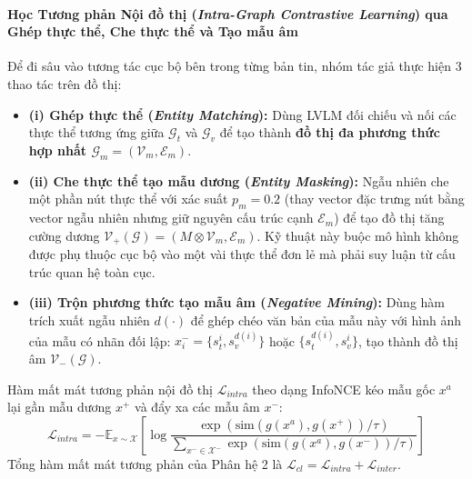 \documentclass[conference,10pt]{IEEEtran}
\begin{document}
\paragraph{Học Tương phản Nội đồ thị (\textit{Intra-Graph Contrastive Learning}) qua Ghép thực thể, Che thực thể và Tạo mẫu âm}
Để đi sâu vào tương tác cục bộ bên trong từng bản tin, nhóm tác giả thực hiện 3 thao tác trên đồ thị:
\begin{itemize}
    \item \textbf{(i) Ghép thực thể (\textit{Entity Matching}):} Dùng LVLM đối chiếu và nối các thực thể tương ứng giữa $\mathcal{G}_t$ và $\mathcal{G}_v$ để tạo thành \textbf{đồ thị đa phương thức hợp nhất $\mathcal{G}_m = (\mathcal{V}_m, \mathcal{E}_m)$}.
    \item \textbf{(ii) Che thực thể tạo mẫu dương (\textit{Entity Masking}):} Ngẫu nhiên che một phần nút thực thể với xác suất $p_m = 0.2$ (thay vector đặc trưng nút bằng vector ngẫu nhiên nhưng giữ nguyên cấu trúc cạnh $\mathcal{E}_m$) để tạo đồ thị tăng cường dương $\mathcal{V}_+(\mathcal{G}) = (M \otimes \mathcal{V}_m, \mathcal{E}_m)$. Kỹ thuật này buộc mô hình không được phụ thuộc cục bộ vào một vài thực thể đơn lẻ mà phải suy luận từ cấu trúc quan hệ toàn cục.
    \item \textbf{(iii) Trộn phương thức tạo mẫu âm (\textit{Negative Mining}):} Dùng hàm trích xuất ngẫu nhiên $d(\cdot)$ để ghép chéo văn bản của mẫu này với hình ảnh của mẫu có nhãn đối lập: $x_i^- = \{s_t^i, s_v^{d(i)}\}$ hoặc $\{s_t^{d(i)}, s_v^i\}$, tạo thành đồ thị âm $\mathcal{V}_-(\mathcal{G})$.
\end{itemize}
Hàm mất mát tương phản nội đồ thị $\mathcal{L}_{intra}$ theo dạng InfoNCE kéo mẫu gốc $x^a$ lại gần mẫu dương $x^+$ và đẩy xa các mẫu âm $x^-$:
\begin{equation}
    \mathcal{L}_{intra} = -\mathbb{E}_{x \sim \mathcal{X}} \left[ \log \frac{\exp\left(\text{sim}\left(g(x^a), g(x^+)\right) / \tau\right)}{\sum_{x^- \in \mathcal{X}^-} \exp\left(\text{sim}\left(g(x^a), g(x^-)\right) / \tau\right)} \right]
    \label{eq:cmavrp_lintra}
\end{equation}
Tổng hàm mất mát tương phản của Phân hệ 2 là $\mathcal{L}_{cl} = \mathcal{L}_{intra} + \mathcal{L}_{inter}$.
\end{document}
